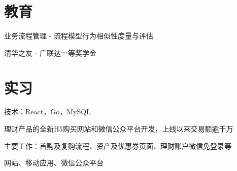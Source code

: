 \documentclass[a4paper]{resume-zh}
\begin{document}
\begin{minipage}[t]{0.72\textwidth} %


\section{教育}

\vspace{\topsep}
\begin{tightitemize}
\item 业务流程管理 - 流程模型行为相似性度量与评估
\item 清华之友 - 广联达一等奖学金
\end{tightitemize}

\sectionspace





\section{实习}

\begin{tightitemize}
\item 技术：React，Go，MySQL
\item 理财产品的全新H5购买网站和微信公众平台开发，上线以来交易额逾千万
\item 主要工作：首购及复购流程、资产及优惠券页面、理财账户微信免登录等
\end{tightitemize}

\sectionspace


\begin{tightitemize}
\item 网站、移动应用、微信公众平台
\end{tightitemize}


\end{minipage}
\end{document}
